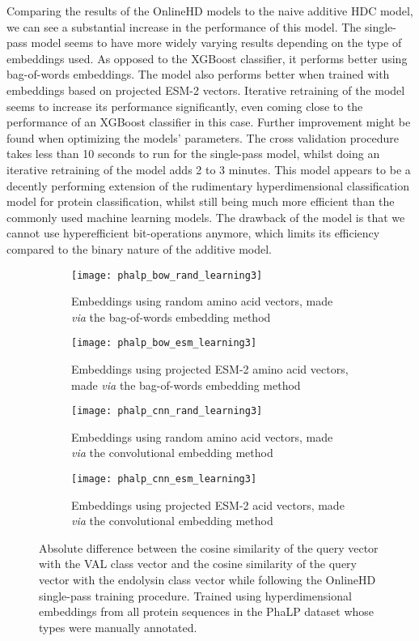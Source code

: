 Comparing the results of the OnlineHD models to the naive additive HDC model, we can see a substantial increase in the performance of this model. The single-pass model seems to have more widely varying results depending on the type of embeddings used. As opposed to the XGBoost classifier, it performs better using bag-of-words embeddings. The model also performs better when trained with embeddings based on projected ESM-2 vectors. Iterative retraining of the model seems to increase its performance significantly, even coming close to the performance of an XGBoost classifier in this case. Further improvement might be found when optimizing the models' parameters. The cross validation procedure takes less than 10 seconds to run for the single-pass model, whilst doing an iterative retraining of the model adds 2 to 3 minutes. This model appears to be a decently performing extension of the rudimentary hyperdimensional classification model for protein classification, whilst still being much more efficient than the commonly used machine learning models. The drawback of the model is that we cannot use hyperefficient bit-operations anymore, which limits its efficiency compared to the binary nature of the additive model.

\begin{figure}[h!]
    \centering
    \begin{subfigure}{0.48\textwidth}
        \texttt{[image: phalp\_bow\_rand\_learning3]}
        \caption{Embeddings using random amino acid vectors, made \textit{via} the bag-of-words embedding method}
        \label{fig:subfig-a2}
    \end{subfigure}
    \hfill
    \begin{subfigure}{0.48\textwidth}
        \texttt{[image: phalp\_bow\_esm\_learning3]}
        \caption{Embeddings using projected ESM-2 amino acid vectors, made \textit{via} the bag-of-words embedding method}
        \label{fig:subfig-b2}
    \end{subfigure}
    
    \begin{subfigure}{0.48\textwidth}
        \texttt{[image: phalp\_cnn\_rand\_learning3]}
        \caption{Embeddings using random amino acid vectors, made \textit{via} the convolutional embedding method}
        \label{fig:subfig-c2}
    \end{subfigure}
    \hfill
    \begin{subfigure}{0.48\textwidth}
        \texttt{[image: phalp\_cnn\_esm\_learning3]}
        \caption{Embeddings using projected ESM-2 acid vectors, made \textit{via} the convolutional embedding method}
        \label{fig:subfig-d2}
    \end{subfigure}
    \caption{Absolute difference between the cosine similarity of the query vector with the VAL class vector and the cosine similarity of the query vector with the endolysin class vector while following the OnlineHD single-pass training procedure. Trained using hyperdimensional embeddings from all protein sequences in the PhaLP dataset whose types were manually annotated.}
    \label{fig:main2}
\end{figure}


